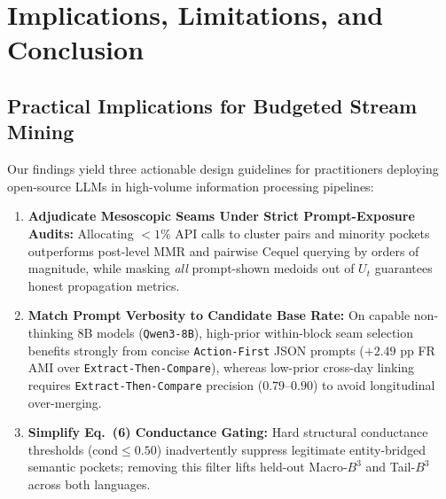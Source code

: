 \section{Implications, Limitations, and Conclusion}
\label{sec:conclusion}

\subsection{Practical Implications for Budgeted Stream Mining}
Our findings yield three actionable design guidelines for practitioners deploying open-source LLMs in high-volume information processing pipelines:
\begin{enumerate}
    \item \textbf{Adjudicate Mesoscopic Seams Under Strict Prompt-Exposure Audits:} Allocating $<1\%$ API calls to cluster pairs and minority pockets outperforms post-level MMR and pairwise Cequel querying by orders of magnitude, while masking \emph{all} prompt-shown medoids out of $U_t$ guarantees honest propagation metrics.
    \item \textbf{Match Prompt Verbosity to Candidate Base Rate:} On capable non-thinking 8B models (\texttt{Qwen3-8B}), high-prior within-block seam selection benefits strongly from concise \texttt{Action-First} JSON prompts ($+2.49\text{ pp}$ FR AMI over \texttt{Extract-Then-Compare}), whereas low-prior cross-day linking requires \texttt{Extract-Then-Compare} precision ($0.79$--$0.90$) to avoid longitudinal over-merging.
    \item \textbf{Simplify Eq.~(6) Conductance Gating:} Hard structural conductance thresholds ($\text{cond} \le 0.50$) inadvertently suppress legitimate entity-bridged semantic pockets; removing this filter lifts held-out Macro-$B^3$ and Tail-$B^3$ across both languages.
\end{enumerate}

